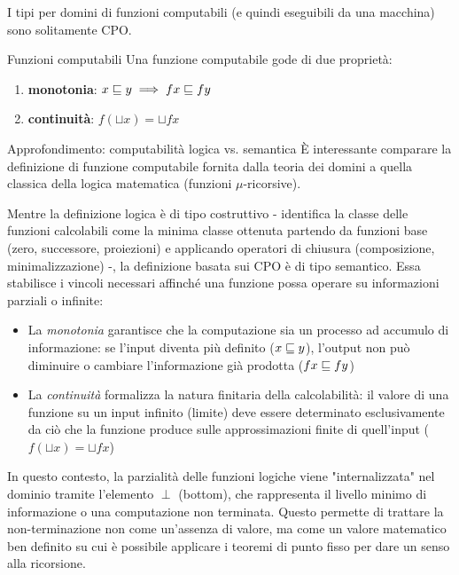 I tipi per domini di funzioni computabili (e quindi eseguibili da una macchina) sono solitamente CPO.

\begin{defframe}{Funzioni computabili}{}
    Una funzione computabile gode di due proprietà:
    \vspace{-0.5em}
    \begin{enumerate}
        \item \textbf{monotonia}: $x \sqsubseteq y \implies f x \sqsubseteq f y$
        \item \textbf{continuità}: $f(\sqcup x) = \sqcup f x$
    \end{enumerate}
\end{defframe}

\begin{gframe}{Approfondimento: computabilità logica vs. semantica}
È interessante comparare la definizione di funzione computabile fornita dalla teoria dei domini a quella classica della logica matematica (funzioni $\mu$-ricorsive). 

Mentre la definizione logica è di tipo costruttivo - identifica la classe delle funzioni calcolabili come la minima classe ottenuta partendo da funzioni base (zero, successore, proiezioni) e applicando operatori di chiusura (composizione, minimalizzazione) -, la definizione basata sui CPO è di tipo semantico. Essa stabilisce i vincoli necessari affinché una funzione possa operare su informazioni parziali o infinite:

\begin{itemize}
    \item La \textit{monotonia} garantisce che la computazione sia un processo ad accumulo di informazione: se l'input diventa più definito ($x \sqsubseteq y$), l'output non può diminuire o cambiare l'informazione già prodotta ($f x \sqsubseteq f y$)
    \item La \textit{continuità} formalizza la natura finitaria della calcolabilità: il valore di una funzione su un input infinito (limite) deve essere determinato esclusivamente da ciò che la funzione produce sulle approssimazioni finite di quell'input ($f(\sqcup x) = \sqcup f x$)
\end{itemize}

In questo contesto, la parzialità delle funzioni logiche viene "internalizzata" nel dominio tramite l'elemento $\perp$ (bottom), che rappresenta il livello minimo di informazione o una computazione non terminata. Questo permette di trattare la non-terminazione non come un'assenza di valore, ma come un valore matematico ben definito su cui è possibile applicare i teoremi di punto fisso per dare un senso alla ricorsione.
\end{gframe}


